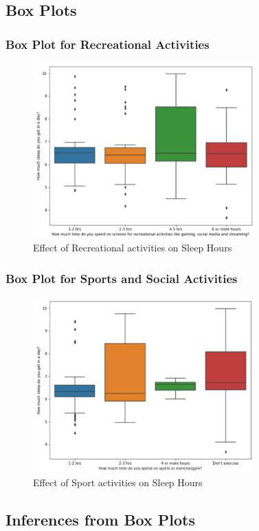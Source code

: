 \documentclass[11pt,]{beamer}
\begin{document}
\subsection{Box Plots}

\begin{frame}
	\frametitle{Box Plot for Recreational Activities}
	
    \begin{figure}
		\includegraphics[width=8.5cm]{BoxPlt_Recreational.png}
		\caption{Effect of Recreational activities on Sleep Hours}
	\end{figure}
	
\end{frame}

\begin{frame}
	\frametitle{Box Plot for Sports and Social Activities}
	
	\begin{figure}
		\includegraphics[width=8.5cm]{BoxPlt_Sports.png}
		\caption{Effect of Sport activities on Sleep Hours}
	\end{figure}

\end{frame}

\subsection{Inferences from Box Plots}
\end{document}
